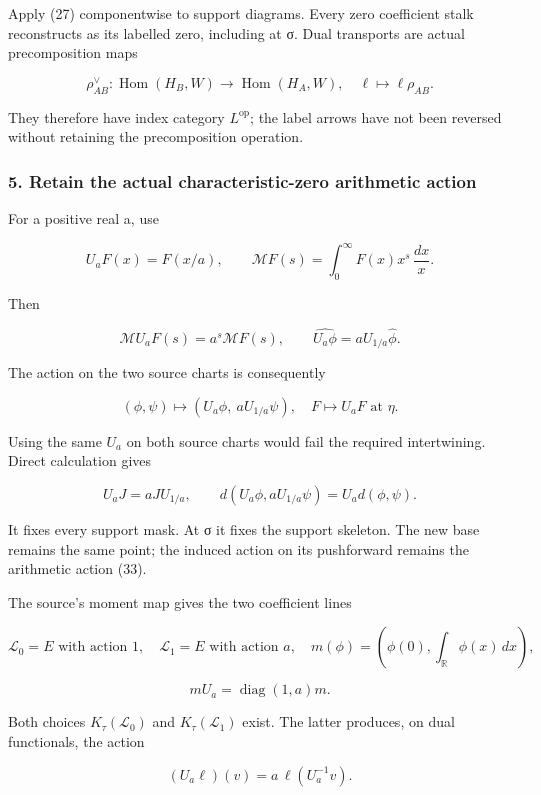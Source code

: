 Apply (27) componentwise to support diagrams. Every zero coefficient stalk reconstructs as its labelled zero, including at σ. Dual transports are actual precomposition maps

\[
\rho_{AB}^{\vee}:\operatorname{Hom}(H_B,W)\longrightarrow
\operatorname{Hom}(H_A,W),\quad\ell\mapsto\ell\rho_{AB}.
\tag{31}
\]

They therefore have index category \(L^{\mathrm{op}}\); the label arrows have not been reversed without retaining the precomposition operation.

\subsubsection{5. Retain the actual characteristic-zero arithmetic action}\label{endpoint-tau_base--retain-the-actual-characteristic-zero-arithmetic-action}

For a positive real a, use

\[
U_aF(x)=F(x/a),\qquad
\mathcal M F(s)=\int_0^\infty F(x)x^s\,\frac{dx}{x}.
\tag{32}
\]

Then

\[
\mathcal M U_aF(s)=a^s\mathcal MF(s),\qquad
\widehat{U_a\phi}=aU_{1/a}\widehat\phi.
\tag{33}
\]

The action on the two source charts is consequently

\[
(\phi,\psi)\longmapsto(U_a\phi,\ aU_{1/a}\psi),
\quad
F\longmapsto U_aF\text{ at }\eta.
\tag{34}
\]

Using the same \(U_a\) on both source charts would fail the required intertwining. Direct calculation gives

\[
U_aJ=aJU_{1/a},\qquad d(U_a\phi,aU_{1/a}\psi)=U_a d(\phi,\psi).
\tag{35}
\]

It fixes every support mask. At σ it fixes the support skeleton. The new base remains the same point; the induced action on its pushforward remains the arithmetic action (33).

The source's moment map gives the two coefficient lines

\[
\mathcal L_0=E\text{ with action }1,\quad
\mathcal L_1=E\text{ with action }a,
\quad
m(\phi)=(\phi(0),\int_{\mathbb R}\phi(x)\,dx),
\tag{36}
\]

\[
mU_a=\operatorname{diag}(1,a)m.
\]

Both choices \(K_\tau(\mathcal L_0)\) and \(K_\tau(\mathcal L_1)\) exist. The latter produces, on dual functionals, the action

\[
(U_a\ell)(v)=a\,\ell(U_a^{-1}v).
\tag{37}
\]

